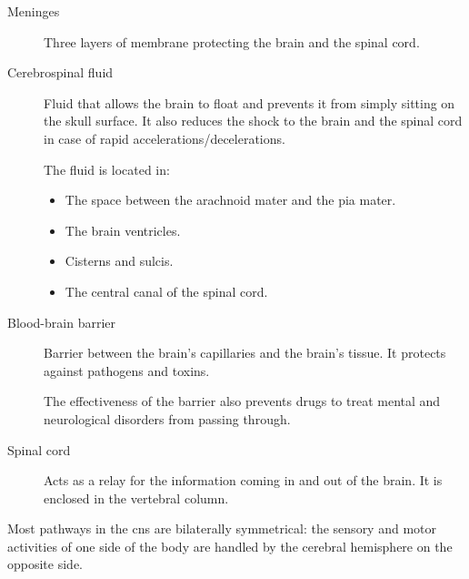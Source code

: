 \begin{description}
    \item[Meninges] 
        Three layers of membrane protecting the brain and the spinal cord.

    \item[Cerebrospinal fluid] 
        Fluid that allows the brain to float and prevents it from simply sitting on the skull surface.
        It also reduces the shock to the brain and the spinal cord in case of rapid accelerations/decelerations.

        The fluid is located in:
        \begin{itemize}
            \item The space between the arachnoid mater and the pia mater.
            \item The brain ventricles.
            \item Cisterns and sulcis.
            \item The central canal of the spinal cord.
        \end{itemize}

    \item[Blood-brain barrier] 
        Barrier between the brain's capillaries and the brain's tissue.
        It protects against pathogens and toxins.

        \begin{remark}
            The effectiveness of the barrier also prevents drugs to treat mental and neurological disorders from passing through.
        \end{remark}

    \item[Spinal cord] 
        Acts as a relay for the information coming in and out of the brain.
        It is enclosed in the vertebral column.
\end{description}

\begin{remark}
    Most pathways in the \ac{cns} are bilaterally symmetrical: 
    the sensory and motor activities of one side of the body are handled by the cerebral hemisphere on the opposite side.
\end{remark}


